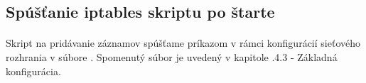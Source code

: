 \subsection{Spúšťanie iptables skriptu po štarte}
\paragraph{}
Skript na pridávanie záznamov  spúšťame príkazom  v rámci konfigurácií sieťového rozhrania  v súbore . Spomenutý súbor je uvedený v kapitole \say.{4.3 - Základná konfigurácia}.